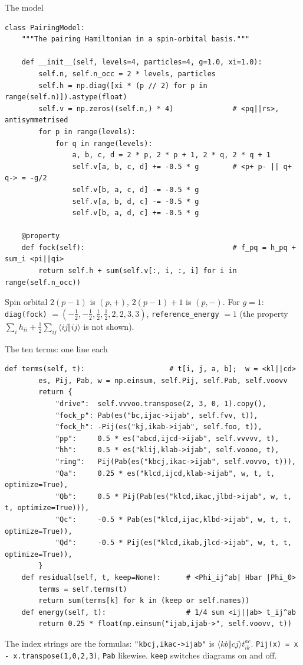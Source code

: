 \documentclass[aspectratio=169,10pt]{beamer}
\newcommand{\as}[4]{\langle #1#2\Vert #3#4\rangle}
\begin{document}
\begin{frame}[fragile,shrink=7]{The model}
\begin{lstlisting}[style=big]
class PairingModel:
    """The pairing Hamiltonian in a spin-orbital basis."""

    def __init__(self, levels=4, particles=4, g=1.0, xi=1.0):
        self.n, self.n_occ = 2 * levels, particles
        self.h = np.diag([xi * (p // 2) for p in range(self.n)]).astype(float)
        self.v = np.zeros((self.n,) * 4)              # <pq||rs>, antisymmetrised
        for p in range(levels):
            for q in range(levels):
                a, b, c, d = 2 * p, 2 * p + 1, 2 * q, 2 * q + 1
                self.v[a, b, c, d] += -0.5 * g        # <p+ p- || q+ q-> = -g/2
                self.v[b, a, c, d] -= -0.5 * g
                self.v[a, b, d, c] -= -0.5 * g
                self.v[b, a, d, c] += -0.5 * g

    @property
    def fock(self):                                   # f_pq = h_pq + sum_i <pi||qi>
        return self.h + sum(self.v[:, i, :, i] for i in range(self.n_occ))
\end{lstlisting}
\small Spin orbital $2(p-1)$ is $(p,+)$, $2(p-1)+1$ is $(p,-)$. For $g=1$: \texttt{diag(fock)} $=(-\tfrac12,-\tfrac12,\tfrac12,\tfrac12,2,2,3,3)$, \texttt{reference\_energy} $=1$ (the property $\sum_ih_{ii}+\tfrac12\sum_{ij}\as ijij$ is not shown).
\end{frame}

\begin{frame}[fragile,shrink=10]{The ten terms: one line each}
\begin{lstlisting}[style=big]
    def terms(self, t):                    # t[i, j, a, b];  w = <kl||cd>
        es, Pij, Pab, w = np.einsum, self.Pij, self.Pab, self.voovv
        return {
            "drive":  self.vvvoo.transpose(2, 3, 0, 1).copy(),
            "fock_p": Pab(es("bc,ijac->ijab", self.fvv, t)),
            "fock_h": -Pij(es("kj,ikab->ijab", self.foo, t)),
            "pp":     0.5 * es("abcd,ijcd->ijab", self.vvvvv, t),
            "hh":     0.5 * es("klij,klab->ijab", self.voooo, t),
            "ring":   Pij(Pab(es("kbcj,ikac->ijab", self.vovvo, t))),
            "Qa":     0.25 * es("klcd,ijcd,klab->ijab", w, t, t, optimize=True),
            "Qb":     0.5 * Pij(Pab(es("klcd,ikac,jlbd->ijab", w, t, t, optimize=True))),
            "Qc":     -0.5 * Pab(es("klcd,ijac,klbd->ijab", w, t, t, optimize=True)),
            "Qd":     -0.5 * Pij(es("klcd,ikab,jlcd->ijab", w, t, t, optimize=True)),
        }
    def residual(self, t, keep=None):      # <Phi_ij^ab| Hbar |Phi_0>
        terms = self.terms(t)
        return sum(terms[k] for k in (keep or self.names))
    def energy(self, t):                   # 1/4 sum <ij||ab> t_ij^ab
        return 0.25 * float(np.einsum("ijab,ijab->", self.voovv, t))
\end{lstlisting}
\small The index strings are the formulas: \texttt{"kbcj,ikac->ijab"} is $\as kbcj t_{ik}^{ac}$. \texttt{Pij(x) = x - x.transpose(1,0,2,3)}, \texttt{Pab} likewise. \texttt{keep} switches diagrams on and off.
\end{frame}
\end{document}
